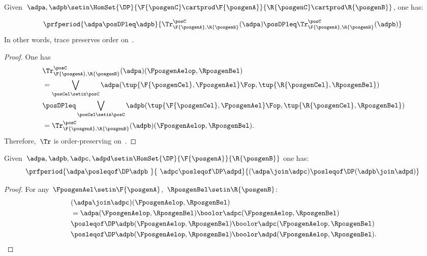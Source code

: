 \begin{lemma}
    \label{lem:trace_pres_order}
    Given~$\adpa,\adpb\setin \HomSet{\DP}{\F{\posgenC}\cartprod \F{\posgenA}}{\R{\posgenC}\cartprod \R{\posgenB}}$, one has:

    \begin{equation}
        \prfperiod{\adpa\posDPleq \adpb}{\Tr_{\F{\posgenA},\R{\posgenB}}^\posC(\adpa)\posDPleq \Tr_{\F{\posgenA},\R{\posgenB}}^\posC(\adpb)}
    \end{equation}
    In other words, trace preserves order on~\DP.
\end{lemma}

\begin{proof}
    One has
    \begin{equation}
        \label{eq:trace_pres_ord}
        \begin{aligned}
            ~ & \Tr_{\F{\posgenA},\R{\posgenB}}^\posC(\adpa)(\FposgenAelop,\RposgenBel) \\
              & = \bigvee_{\posCel\setin \posC}\adpa(\tup{\F{\posgenCel},\FposgenAel}\Fop,\tup{\R{\posgenCel},\RposgenBel}) \\
              & \posDPleq \bigvee_{\posCel\setin \posC}\adpb(\tup{\F{\posgenCel},\FposgenAel}\Fop,\tup{\R{\posgenCel},\RposgenBel}) \\
              & =\Tr_{\F{\posgenA},\R{\posgenB}}^\posC(\adpb)(\FposgenAelop,\RposgenBel).
        \end{aligned}
    \end{equation}
    Therefore,~$\Tr$ is order-preserving on~\DP.
\end{proof}

\begin{lemma}
    \label{lem:coprod_mon}
    Given~$\adpa,\adpb,\adpc,\adpd \setin \HomSet{\DP}{\F{\posgenA}}{\R{\posgenB}}$ one has:
    \begin{equation}
        \prfperiod{\adpa\posleqof\DP \adpb\ }{\ \adpc\posleqof\DP\adpd}{(\adpa\join\adpc)\posleqof\DP (\adpb\join \adpd)}
    \end{equation}
\end{lemma}
\begin{proof}
    For any~$\FposgenAel\setin \F{\posgenA}$,~$\RposgenBel\setin \R{\posgenB}$:
    \begin{equation}
        \begin{aligned}
            ~ & (\adpa \join \adpc)(\FposgenAelop,\RposgenBel) \\
              & =\adpa(\FposgenAelop,\RposgenBel)\boolor \adpc(\FposgenAelop,\RposgenBel) \\
              & \posleqof\DP \adpb(\FposgenAelop,\RposgenBel)\boolor \adpc(\FposgenAelop,\RposgenBel) \\
              & \posleqof\DP \adpb(\FposgenAelop,\RposgenBel)\boolor \adpd(\FposgenAelop,\RposgenBel).
        \end{aligned}
    \end{equation}
\end{proof}

